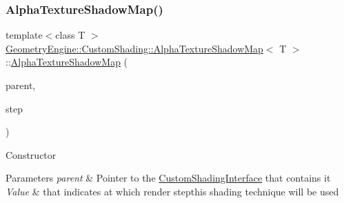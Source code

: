 \subsubsection{\texorpdfstring{AlphaTextureShadowMap()}{AlphaTextureShadowMap()}\hspace{0.1cm}{\footnotesize\ttfamily [1/2]}}
{\footnotesize\ttfamily template$<$class T $>$ \\
\mbox{\hyperlink{class_geometry_engine_1_1_custom_shading_1_1_alpha_texture_shadow_map}{Geometry\+Engine\+::\+Custom\+Shading\+::\+Alpha\+Texture\+Shadow\+Map}}$<$ T $>$\+::\mbox{\hyperlink{class_geometry_engine_1_1_custom_shading_1_1_alpha_texture_shadow_map}{Alpha\+Texture\+Shadow\+Map}} (\begin{DoxyParamCaption}\item[{\mbox{\hyperlink{class_geometry_engine_1_1_custom_shading_1_1_custom_shading_interface}{Custom\+Shading\+Interface}} $\ast$}]{parent,  }\item[{\mbox{\hyperlink{namespace_geometry_engine_1_1_custom_shading_a2dc236a5b567da5099069ce2b2be5609}{Custom\+Shading\+Steps}}}]{step }\end{DoxyParamCaption})\hspace{0.3cm}{\ttfamily [inline]}}

Constructor 
\begin{DoxyParams}{Parameters}
{\em parent} & Pointer to the \mbox{\hyperlink{class_geometry_engine_1_1_custom_shading_1_1_custom_shading_interface}{Custom\+Shading\+Interface}} that contains it \\
\hline
{\em Value} & that indicates at which render stepthis shading technique will be used \\
\hline
\end{DoxyParams}
\mbox{\label{class_geometry_engine_1_1_custom_shading_1_1_alpha_texture_shadow_map_a48d3c0a306c157d9c56bfb68256a260c}} 
